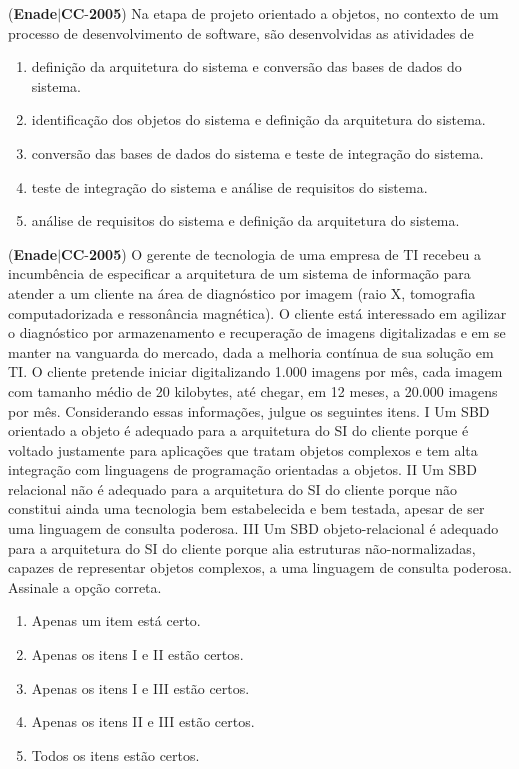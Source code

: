 \documentclass{exam}
\begin{document}
\begin{questions}
\begin{enumerate}[label=\alph*)]
	\end{enumerate}

\question (\textbf{Enade}$|$\textbf{CC}-\textbf{2005}) Na etapa de projeto orientado a objetos, no contexto de um
processo de desenvolvimento de software, são desenvolvidas as
atividades de
	\begin{enumerate}[label=\alph*)]
		\item  definição da arquitetura do sistema e conversão das bases de
dados do sistema.
		\item  identificação dos objetos do sistema e definição da
arquitetura do sistema.
		\item  conversão das bases de dados do sistema e teste de
integração do sistema.
		\item  teste de integração do sistema e análise de requisitos do
sistema.
		\item  análise de requisitos do sistema e definição da arquitetura
do sistema.

	\end{enumerate}

\question (\textbf{Enade}$|$\textbf{CC}-\textbf{2005}) O gerente de tecnologia de uma empresa de TI
recebeu a incumbência de especificar a arquitetura de um
sistema de informação para atender a um cliente na área de
diagnóstico por imagem (raio X, tomografia computadorizada
e ressonância magnética). O cliente está interessado em
agilizar o diagnóstico por armazenamento e recuperação de
imagens digitalizadas e em se manter na vanguarda do
mercado, dada a melhoria contínua de sua solução em TI.
O cliente pretende iniciar digitalizando 1.000 imagens por
mês, cada imagem com tamanho médio de 20 kilobytes, até
chegar, em 12 meses, a 20.000 imagens por mês.
Considerando essas informações, julgue os seguintes itens.
I Um SBD orientado a objeto é adequado para a arquitetura do SI
do cliente porque é voltado justamente para aplicações que
tratam objetos complexos e tem alta integração com linguagens
de programação orientadas a objetos.
II Um SBD relacional não é adequado para a arquitetura do SI do
cliente porque não constitui ainda uma tecnologia bem
estabelecida e bem testada, apesar de ser uma linguagem de
consulta poderosa.
III Um SBD objeto-relacional é adequado para a arquitetura do SI
do cliente porque alia estruturas não-normalizadas, capazes de
representar objetos complexos, a uma linguagem de consulta
poderosa.
Assinale a opção correta.
	\begin{enumerate}[label=\alph*)]
		\item  Apenas um item está certo.
		\item  Apenas os itens I e II estão certos.
		\item  Apenas os itens I e III estão certos.
		\item  Apenas os itens II e III estão certos.
		\item  Todos os itens estão certos.


\end{enumerate}
\end{questions}
\end{document}
